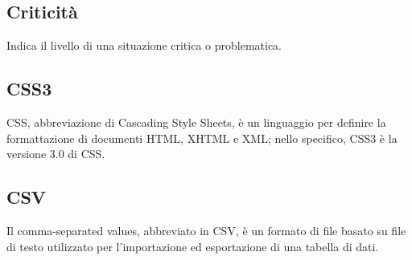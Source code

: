 \subsection*{Criticità}
Indica il livello di una situazione critica o problematica.

\subsection*{CSS3}
CSS, abbreviazione di Cascading Style Sheets, è un linguaggio per definire la formattazione di documenti HTML, XHTML e XML; nello specifico, CSS3 è la versione 3.0 di CSS.

\subsection*{CSV}
Il comma-separated values, abbreviato in CSV, è un formato di file basato su file di testo utilizzato per l'importazione ed esportazione di una tabella di dati.

